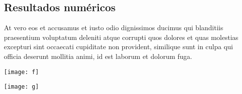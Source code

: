 \documentclass[a0,portrait]{a0poster}
\begin{document}
\begin{mdframed}[style=MyFrame]
\begin{multicols}{2}
			\section{Resultados numéricos}\label{section4}
			
			At vero eos et accusamus et iusto odio dignissimos ducimus qui blanditiis praesentium voluptatum deleniti atque corrupti quos dolores et quas molestias excepturi sint occaecati cupiditate non provident, similique sunt in culpa qui officia deserunt mollitia animi, id est laborum et dolorum fuga.
			\vspace{1cm}
			\begin{minipage}{\columnwidth}
				\texttt{[image: f]}
			\end{minipage}
			\vspace{1cm} %
			
			\begin{minipage}{\columnwidth}
				\texttt{[image: g]}
			\end{minipage}
			
			\usepackage{multicol} %
			\columnsep=100pt %
			\columnseprule=3pt %
			\usepackage{fancybox}
			\usepackage[svgnames]{xcolor} %
			
			\usepackage{epsfig}
			\usepackage{pdfpages}
			\usepackage{cite}
			\usepackage{color}
			\usepackage{colortbl}
			\usepackage[cmex10]{amsmath}
			\usepackage{amssymb}
			\usepackage{soul}
			\usepackage{amsfonts}
			\usepackage[normalem]{ulem}
			\usepackage{booktabs}
			\usepackage{color}
			\usepackage{placeins}
			\usepackage{upgreek}
			\usepackage[utf8]{inputenc}
			
			\usepackage[export]{adjustbox}
			

\end{multicols}
\end{mdframed}
\end{document}
